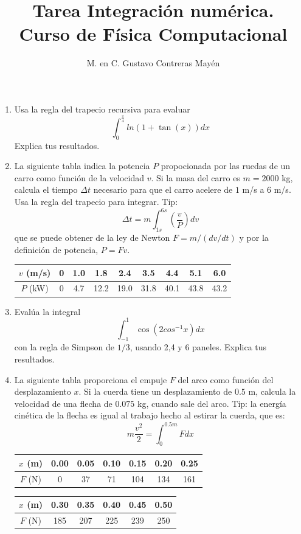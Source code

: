 \documentclass[11pt]{article}
\title{Tarea Integraci\'{o}n num\'{e}rica. \\ Curso de F\'{i}sica Computacional}
\author{M. en C. Gustavo Contreras May\'{e}n}
\date{ }
\begin{document}
\maketitle
\fontsize{13}{13}\selectfont
\begin{enumerate}
\item Usa la regla del trapecio recursiva para evaluar
\[ \int_{0}^{\frac{\pi}{4}} ln(1 + \tan(x)) dx\]
Explica tus resultados.
\item La siguiente tabla indica la potencia $P$ propocionada por las ruedas de un carro como funci\'{o}n de la velocidad $v$. Si la masa del carro es $m=2000$ kg, calcula el tiempo $\Delta t$ necesario para que el carro acelere de $1$ m/s a $6$ m/s. Usa la regla del trapecio para integrar. Tip:
\[ \Delta t = m \int_{1s}^{6s} \left( \dfrac{v}{P} \right) dv\]
que se puede obtener de la ley de Newton $F= m/(dv/dt)$ y por la definici\'{o}n de potencia, $P=Fv$.
\begin{center}
\begin{tabular}{c | c | c | c | c | c | c | c | c}
$v$ (m/s) & 0 & 1.0 & 1.8 & 2.4 & 3.5 & 4.4 & 5.1 & 6.0 \\ \hline
$P$ (kW)  & 0 & 4.7 & 12.2 & 19.0 & 31.8 & 40.1 & 43.8 & 43.2 
\end{tabular}
\end{center}
\item Eval\'{u}a la integral
\[ \int_{-1}^{1} \cos \left( 2 cos^{-1} x \right) dx\]
con la regla de Simpson de $1/3$, usando 2,4 y 6 paneles. Explica tus resultados.
\item La siguiente tabla proporciona el empuje $F$ del arco como funci\'{o}n del desplazamiento $x$. Si la cuerda tiene un desplazamiento de $0.5$ m, calcula la velocidad de una flecha de $0.075$ kg, cuando sale del arco. Tip: la energ\'{i}a cin\'{e}tica de la flecha es igual al trabajo hecho al estirar la cuerda, que es:
\[ m \dfrac{v^{2}}{2} = \int_{0}^{0.5m} F dx\]
\begin{center}
\begin{tabular}{c | c | c | c | c | c | c |}
$x$ (m) & 0.00 & 0.05 & 0.10 & 0.15 & 0.20 & 0.25  \\ \hline
$F$ (N)  & 0 & 37 & 71 & 104 & 134 & 161
\end{tabular}
\end{center}
\begin{center}
\begin{tabular}{c | c | c | c | c | c | }
$x$ (m) & 0.30 & 0.35 & 0.40 & 0.45 & 0.50 \\ \hline
$F$ (N)  & 185 & 207 & 225 & 239 & 250 

\end{tabular}
\end{center}
\end{enumerate}
\end{document}
